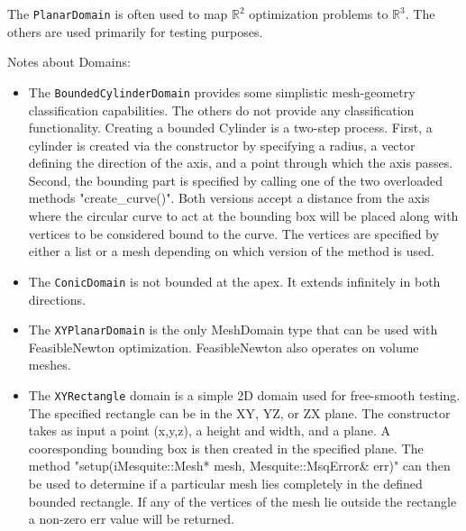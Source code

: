The \texttt{PlanarDomain} is often used to map $\mathbb{R}^{2}$ optimization
problems to $\mathbb{R}^{3}$.  The others are used primarily for testing
purposes.  

\medskip
\noindent Notes about Domains:
\begin{itemize}
\item The \texttt{BoundedCylinderDomain} provides some simplistic mesh-geometry classification capabilities.  The others do not provide any classification functionality.  Creating a bounded Cylinder is a two-step process. First, a cylinder is created via the constructor by specifying a radius, a vector defining the direction of the axis, and a point through which the axis passes.  Second, the bounding part is specified by calling one of the two overloaded methods "create\_curve()".  Both versions accept a distance from the axis where the circular curve to act at the bounding box will be placed along with vertices to be considered bound to the curve.  The vertices are specified by either a list or a mesh depending on which version of the method is used.
\item The \texttt{ConicDomain} is not bounded at the apex.  It extends infinitely in  both directions.
\item The \texttt{XYPlanarDomain} is the only MeshDomain type that can be used with FeasibleNewton optimization.  FeasibleNewton also operates on volume meshes. 
\item The \texttt{XYRectangle} domain is a simple 2D domain used for free-smooth testing. The specified rectangle can be in the XY, YZ, or ZX plane.   The constructor takes as input a point (x,y,z), a height and width, and a plane.  A cooresponding bounding box is then created in the specified plane. The method "setup(iMesquite::Mesh* mesh, Mesquite::MsqError\& err)" can then be used to determine if a particular mesh lies completely in the defined bounded rectangle. If any of the vertices of the mesh lie outside the rectangle a non-zero err value will be returned.
\end{itemize}
   
